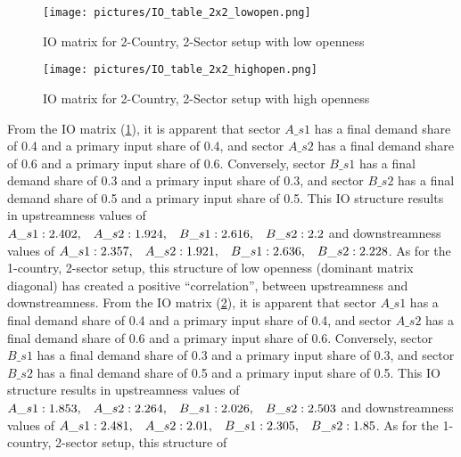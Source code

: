 \begin{figure}[H]
    \centering 
    \texttt{[image: pictures/IO\_table\_2x2\_lowopen.png]}
    \caption{\label{fig:IO2x2_lowopen} IO matrix for 2-Country, 2-Sector setup with low openness}
    
\end{figure}

\begin{figure}[H]
    \centering
    
    \texttt{[image: pictures/IO\_table\_2x2\_highopen.png]}
    \caption{\label{fig:IO2x2_highopen} IO matrix for 2-Country, 2-Sector setup with high openness}
\end{figure}

From the IO matrix (\ref{fig:IO2x2_lowopen}), it is apparent that sector $A\_s1$ has a final demand share of 0.4 and a primary input share of 0.4, and 
sector $A\_s2$ has a final demand share of 0.6 and a primary input share of 0.6. Conversely, sector $B\_s1$ has a final demand share of 0.3 and a 
primary input share of 0.3, and sector $B\_s2$ has a final demand share of 0.5 and a primary input share of 0.5. This IO structure results in 
upstreamness values of
$A\_s1: 2.402,\hspace{3mm} A\_s2: 1.924,\hspace{3mm} B\_s1: 2.616,\hspace{3mm} B\_s2: 2.2$ and downstreamness values of 
$A\_s1: 2.357,\hspace{3mm} A\_s2: 1.921,\hspace{3mm} B\_s1: 2.636,\hspace{3mm} B\_s2: 2.228$. As for the 1-country, 2-sector setup, this structure of low openness (dominant matrix diagonal) has 
created a positive ``correlation'', between upstreamness and downstreamness.
From the IO matrix (\ref{fig:IO2x2_highopen}), it is apparent that sector $A\_s1$ has a final demand share of 0.4 and a primary input share of 0.4, and 
sector $A\_s2$ has a final demand share of 0.6 and a primary input share of 0.6. Conversely, sector $B\_s1$ has a final demand share of 0.3 and a 
primary input share of 0.3, and sector $B\_s2$ has a final demand share of 0.5 and a primary input share of 0.5. This IO structure results in 
upstreamness values of 
$A\_s1: 1.853,\hspace{3mm} A\_s2: 2.264,\hspace{3mm} B\_s1: 2.026,\hspace{3mm} B\_s2: 2.503$ and downstreamness values of 
$A\_s1: 2.481,\hspace{3mm} A\_s2: 2.01,\hspace{3mm} B\_s1: 2.305,\hspace{3mm} B\_s2: 1.85$.  As for the 1-country, 2-sector setup, this structure of 
